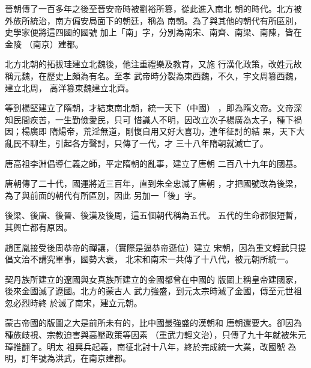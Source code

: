 \documentclass[avery5371,grid]{flashcards}
\begin{document}
{晉朝傳了一百多年之後至晉安帝時被劉裕所篡，從此進入南北
朝的時代。北方被外族所統治，南方偏安局面下的朝廷，稱為
南朝。為了與其他的朝代有所區別，史學家便將這四國的國號
加上「南」字，分別為南宋、南齊、南梁、南陳，皆在金陵
（南京）建都。} %
{} %

{北方北朝的拓拔珪建立北魏後，他注重禮樂及教育，又施
行漢化政策，改姓元故稱元魏，在歷史上頗為有名。至孝
武帝時分裂為東西魏，不久，宇文周篡西魏，建立北周，
高洋篡東魏建立北齊。} %
{} %

{等到楊堅建立了隋朝，才結束南北朝，統一天下（中國）
，即為隋文帝。文帝深知民間疾苦，一生勤儉愛民，只可
惜識人不明，因改立次子楊廣為太子，種下禍因；楊廣即
隋煬帝，荒淫無道，剛愎自用又好大喜功，連年征討的結
果，天下大亂民不聊生，引起各方聲討，只傳了一代，才
三十八年隋朝就滅亡了。} %
{} %




{唐高祖李淵倡導仁義之師，平定隋朝的亂事，建立了唐朝
二百八十九年的國基。} %
{} %

{唐朝傳了二十代，國運將近三百年，直到朱全忠滅了唐朝
，才把國號改為後梁，為了與前面的朝代有所區別，因此
另加一「後」字。} %
{} %

{後梁、後唐、後晉、後漢及後周，這五個朝代稱為五代。
五代的生命都很短暫，其興亡都有原因。} %
{} %

{趙匡胤接受後周恭帝的禪讓，（實際是逼恭帝遜位）建立
宋朝，因為重文輕武只提倡文治不講究軍事，國勢大衰，
北宋和南宋一共傳了十八代，被元朝所統一。} %
{} %

{契丹族所建立的遼國與女真族所建立的金國都曾在中國的
版圖上稱皇帝建國家，後來金國滅了遼國。北方的蒙古人
武力強盛，到元太宗時滅了金國，傳至元世祖忽必烈時終
於滅了南宋，建立元朝。} %
{} %

{蒙古帝國的版圖之大是前所未有的，比中國最強盛的漢朝和
唐朝還要大。卻因為種族歧視、宗教迫害與高壓政策等因素
（重武力輕文治），只傳了九十年就被朱元璋推翻了。明太
祖興兵起義，南征北討十八年，終於完成統一大業，改國號
為明，訂年號為洪武，在南京建都。} %
{} %
\end{document}
